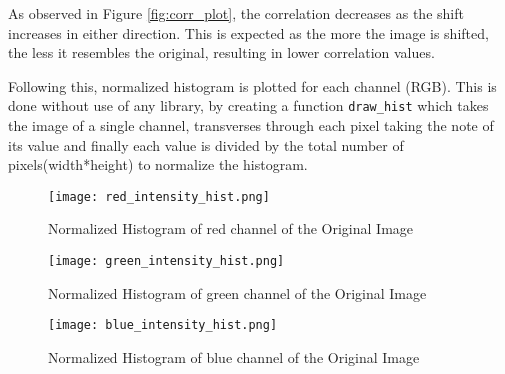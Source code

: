 \begin{tcolorbox}[breakable]
\begin{sol}
		As observed in Figure \ref{fig:corr_plot}, the correlation
		decreases as the shift increases in either direction. This is
		expected as the more the image is shifted, the less it
		resembles the original, resulting in lower correlation values.

		Following this, normalized histogram is plotted for each
		channel (RGB). This is done without use of any library, by
		creating a function \texttt{draw\_hist} which takes the image
		of a single channel, transverses through each pixel taking the
		note of its value and finally each value is divided by the
		total number of pixels(width*height) to normalize the
		histogram.

		\begin{figure}[H]
			\centering
			\texttt{[image: red\_intensity\_hist.png]}
			\caption{Normalized Histogram of red channel of the Original Image}
			\label{fig:hist_red_plot}
		\end{figure}
		\begin{figure}[H]
			\centering
			\texttt{[image: green\_intensity\_hist.png]}
			\caption{Normalized Histogram of green channel of the Original Image}
			\label{fig:hist_green_plot}
		\end{figure}
		\begin{figure}[H]
			\centering
			\texttt{[image: blue\_intensity\_hist.png]}
			\caption{Normalized Histogram of blue channel of the Original Image}
			\label{fig:hist_blue_plot}
		\end{figure}
	\end{sol}
\end{tcolorbox}

